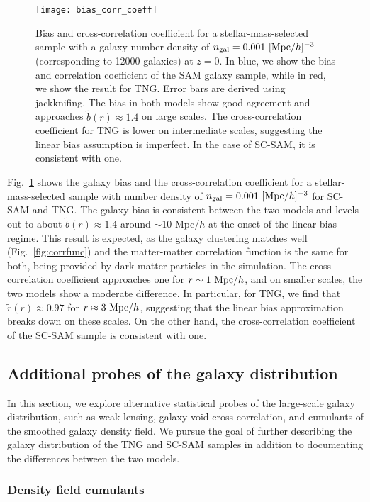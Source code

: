 \documentclass[fleqn,usenatbib]{mnras}
\begin{document}
\begin{figure}
\centering  
\texttt{[image: bias\_corr\_coeff]}
\caption{Bias and cross-correlation coefficient for a stellar-mass-selected sample with a galaxy number density of $n_{\rm gal} = 0.001 \ [{\rm Mpc}/h]^{-3}$ (corresponding to 12000 galaxies) at $z = 0$. In blue, we show the bias and correlation coefficient of the SAM galaxy sample, while in red, we show the result for TNG. Error bars are derived using jackknifing. The bias in both models show good agreement and approaches $\tilde b(r) \approx 1.4$ on large scales. The cross-correlation coefficient for TNG is lower on intermediate scales, suggesting the linear bias assumption is imperfect. In the case of SC-SAM, it is consistent with one.}
\label{fig:bias_corr_coeff}
\end{figure}

Fig.~\ref{fig:bias_corr_coeff} shows the galaxy bias and the cross-correlation coefficient for a stellar-mass-selected sample with number density of $n_{\rm gal} = 0.001 \ [{\rm Mpc}/h]^{-3}$ for SC-SAM and TNG. The galaxy bias is consistent between the two models and levels out to about $\tilde b(r) \approx 1.4$ around $\sim$10 Mpc/$h$ at the onset of the linear bias regime. This result is expected, as the galaxy clustering matches well (Fig.~\ref{fig:corrfunc}) and the matter-matter correlation function is the same for both, being provided by dark matter particles in the simulation. The cross-correlation coefficient approaches one for $r \sim 1 \ {\rm Mpc}/h$, and on smaller scales, the two models show a moderate difference. In particular, for TNG, we find that $\tilde r(r) \approx 0.97$ for $r \approx 3 \ {\rm Mpc}/h$, suggesting that the linear bias approximation breaks down on these scales. On the other hand, the cross-correlation coefficient of the SC-SAM sample is consistent with one.

\subsection{Additional probes of the galaxy distribution}
\label{sec:stats}
In this section, we explore alternative statistical probes of the large-scale galaxy distribution, such as weak lensing, galaxy-void cross-correlation, and cumulants of the smoothed galaxy density field. We pursue the goal of further describing the galaxy distribution of the TNG and SC-SAM samples in addition to documenting the differences between the two models.

\subsubsection{Density field cumulants}
\end{document}
